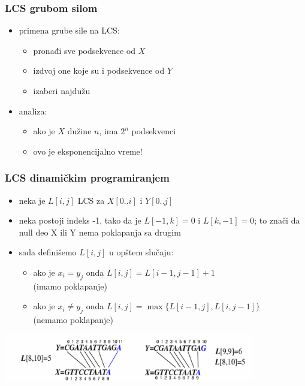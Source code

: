\documentclass[compress]{beamer}
\begin{document}
\begin{frame}[fragile]
  \frametitle{LCS grubom silom}
  \begin{itemize}
    \item primena grube sile na LCS:
    \begin{itemize}
      \item pronađi sve podsekvence od $X$
      \item izdvoj one koje su i podsekvence od $Y$
      \item izaberi najdužu
    \end{itemize}
    \item analiza:
    \begin{itemize}
      \item ako je $X$ dužine $n$, ima $2^n$ podsekvenci
      \item ovo je eksponencijalno vreme!
    \end{itemize}
  \end{itemize}
\end{frame}

\begin{frame}[fragile]
  \frametitle{LCS dinamičkim programiranjem}
  \begin{itemize}
    \item neka je $L[i,j]$ LCS za $X[0..i]$ i $Y[0..j]$
    \item neka postoji indeks -1, tako da je $L[-1,k]=0$ i $L[k,-1]=0$; 
    to znači da null deo X ili Y nema poklapanja sa drugim
    \item sada definišemo $L[i,j]$ u opštem slučaju:
    \begin{itemize}
      \item ako je $x_{i}=y_{j}$ onda $L[i,j] = L[i-1,j-1]+1$ \\ (imamo poklapanje)
      \item ako je $x_{i}\neq y_{j}$ onda $L[i,j] = \max\{L[i-1,j], L[i,j-1]\}$ \\ (nemamo poklapanje)
    \end{itemize}
  \end{itemize}
  \begin{center}
    \includegraphics[width=11cm]{asp-13-pic10.png}
  \end{center}
\end{frame}
\end{document}
